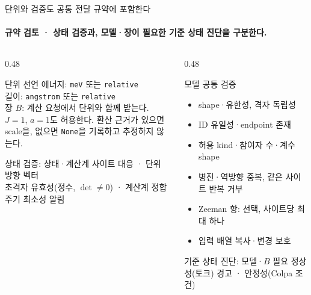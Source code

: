 \begin{frame}[label=validation]{단위와 검증도 공통 전달 규약에 포함한다}
  \framesubtitle{규약 검토 · 상태 검증과, 모델·장이 필요한 기준 상태 진단을 구분한다.}
  \begin{columns}[T,onlytextwidth]
    \begin{column}{0.48\textwidth}
      \begin{block}{단위 선언}
        에너지: \texttt{meV} 또는 \texttt{relative}\\
        길이: \texttt{angstrom} 또는 \texttt{relative}\\
        장 $B$: 계산 요청에서 단위와 함께 받는다.\\[0.4em]
        $J=1$, $a=1$도 허용한다. 환산 근거가 있으면 scale을,
        없으면 \texttt{None}을 기록하고 추정하지 않는다.
      \end{block}
      \begin{block}{상태 검증: 상태·계산계}
        사이트 대응 · 단위 방향 벡터\\
        초격자 유효성(정수, $\det\neq0$) · 계산계 정합\\
        주기 최소성 알림
      \end{block}
    \end{column}
    \begin{column}{0.48\textwidth}
      \begin{block}{모델 공통 검증}
        \begin{itemize}
          \item shape·유한성, 격자 독립성
          \item ID 유일성·endpoint 존재
          \item 허용 kind·참여자 수·계수 shape
          \item 병진·역방향 중복, 같은 사이트 반복 거부
          \item Zeeman 항: 선택, 사이트당 최대 하나
          \item 입력 배열 복사·변경 보호
        \end{itemize}
      \end{block}
      \begin{block}{기준 상태 진단: 모델·$B$ 필요}
        정상성(토크) 경고 · 안정성(Colpa 조건)
      \end{block}
    \end{column}
  \end{columns}
\end{frame}

